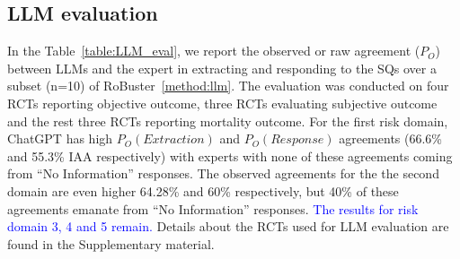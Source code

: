 \documentclass[sn-mathphys,Numbered]{sn-jnl}%
\theoremstyle{thmstyleone}%
\theoremstyle{thmstyletwo}%
\theoremstyle{thmstylethree}%
\begin{document}
%
%
%
\subsection{LLM evaluation}
%
In the Table~\ref{table:LLM_eval}, we report the observed or raw agreement ($P_{O}$) between LLMs and the expert in extracting and responding to the SQs over a subset (n=10) of RoBuster~\ref{method:llm}.
The evaluation was conducted on four RCTs reporting objective outcome, three RCTs evaluating subjective outcome and the rest three RCTs reporting mortality outcome.
For the first risk domain, ChatGPT has high $P_{O} (Extraction)$ and $P_{O} (Response)$ agreements (66.6\% and 55.3\% IAA respectively) with experts with none of these agreements coming from ``No Information'' responses. %
The observed agreements for the the second domain are even higher 64.28\% and 60\% respectively, but 40\% of these agreements emanate from ``No Information'' responses. %
\textcolor{blue}{The results for risk domain 3, 4 and 5 remain.}
Details about the RCTs used for LLM evaluation are found in the Supplementary material.
%
%
%
\end{document}
